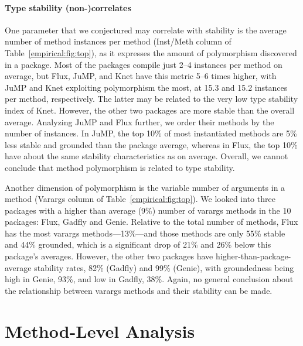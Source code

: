 \paragraph{Type stability (non-)correlates}
One parameter that we conjectured may correlate with stability is the average
number of method instances per method (Inst/Meth column of
Table~\ref{empirical:fig:top}), as it expresses the amount of polymorphism
discovered in a package. Most of the packages compile just 2--4 instances per
method on average, but Flux, JuMP, and Knet have this metric 5--6 times higher,
with JuMP and Knet exploiting polymorphism the most, at 15.3 and 15.2
instances per method, respectively. The latter may be related to the very low type stability
index of Knet. However, the other two packages are more stable than the overall
average. Analyzing JuMP and Flux further, we order their methods by the number
of instances. In JuMP, the top 10\% of most instantiated methods are 5\% less
stable and grounded than the package average, whereas in Flux, the top 10\% have
about the same stability characteristics as on average. Overall, we cannot
conclude that method polymorphism is related to type stability.

Another dimension of polymorphism is the variable number of arguments in a
method (Varargs column of Table~\ref{empirical:fig:top}). We looked into three
packages with a higher than average (9\%) number of varargs methods in the 10
packages: Flux, Gadfly and Genie. Relative to the total number of methods, Flux has the most
varargs methods---13\%---and those methods are only 55\% stable and 44\%
grounded, which is a significant drop of 21\% and 26\% below this package's
averages. However, the other two packages have higher-than-package-average
stability rates, 82\% (Gadfly) and 99\% (Genie), with groundedness being high in
Genie, 93\%, and low in Gadfly, 38\%. Again, no general conclusion about the
relationship between varargs methods and their stability can be made.

\section{Method-Level Analysis}


